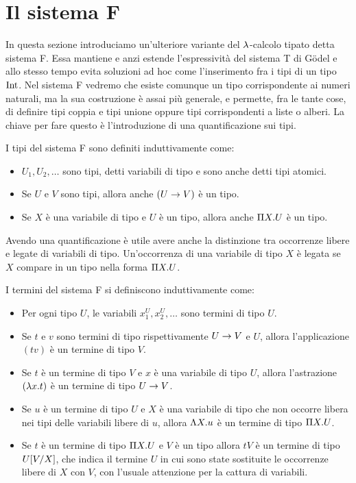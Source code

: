 \documentclass[]{marticle}
\begin{document}
\section{Il sistema F}

In questa sezione introduciamo un'ulteriore variante del $\l$-calcolo tipato
detta sistema F. Essa mantiene e anzi estende l'espressivit\`a del sistema T di
G\"odel e allo stesso tempo evita soluzioni ad hoc come l'inserimento fra i tipi
di un tipo $\tint$. Nel sistema F vedremo che esiste comunque un tipo
corrispondente ai numeri naturali, ma la sua costruzione \`e assai pi\`u
generale, e permette, fra le tante cose, di definire tipi coppia e tipi unione
oppure tipi corrispondenti a liste o alberi. La chiave per fare questo \`e
l'introduzione di una quantificazione sui tipi.

\begin{block}[Definizione]
    I tipi del sistema F sono definiti induttivamente come:
    \begin{itemize}
        \item $U_1, U_2, \dots$ sono tipi, detti variabili di tipo e sono anche
            detti tipi atomici.
        \item Se $U$ e $V$ sono tipi, allora anche $(U\rar V)$ \`e un tipo.
        \item Se $X$ \`e una variabile di tipo e $U$ \`e un tipo, allora anche
            $\P X. U$ \`e un tipo.
    \end{itemize}
\end{block}

Avendo una quantificazione \`e utile avere anche la distinzione tra occorrenze
libere e legate di variabili di tipo. Un'occorrenza di una variabile di tipo $X$
\`e legata se $X$ compare in un tipo nella forma $\P X. U$.

\begin{block}[Definizione]
    I termini del sistema F si definiscono induttivamente come:
    \begin{itemize}
        \item Per ogni tipo $U$, le variabili $x^U_1, x^U_2, \dots$ sono termini
            di tipo $U$.
        \item Se $t$ e $v$ sono termini di tipo rispettivamente $U\rar V$ e $U$,
            allora l'applicazione $(tv)$ \`e un termine di tipo $V$.
        \item Se $t$ \`e un termine di tipo $V$ e $x$ \`e una variabile di tipo
            $U$, allora l'astrazione $(\l x.  t)$ \`e un termine di tipo $U\rar
            V$.
        \item Se $u$ \`e un termine di tipo $U$ e $X$ \`e una variabile di tipo
            che non occorre libera nei tipi delle variabili libere di $u$,
            allora $\L X. u$ \`e un termine di tipo $\P X.U$. 
        \item Se $t$ \`e un termine di tipo $\P X. U$ e $V$ \`e un tipo allora
            $tV$ \`e un termine di tipo $U\sub{V}{X}$, che indica il termine $U$
            in cui sono state sostituite le occorrenze libere di $X$ con $V$,
            con l'usuale attenzione per la cattura di variabili.
    \end{itemize}
\end{block}
\end{document}
